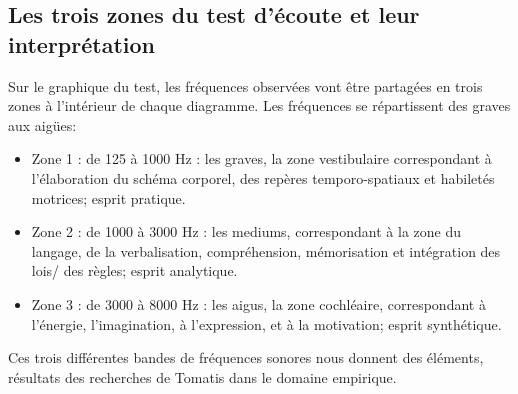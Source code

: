 \subsection*{Les trois zones du test d'écoute et leur interprétation}
Sur le graphique du test, les fréquences observées vont être partagées en
trois zones à l\textquoteright intérieur
de chaque diagramme. Les fréquences se répartissent des
graves aux aigües:
\begin{itemize}
	\item Zone 1 : de 125 à 1000 Hz : les graves, la zone vestibulaire correspondant à l'élaboration
	du schéma corporel, des repères temporo-spatiaux et habiletés motrices; 
	esprit pratique.
	\item Zone 2 : de 1000 à 3000 Hz : les mediums, correspondant à  la zone du langage, de la
	verbalisation, compréhension, %
	mémorisation %
	et intégration des lois/
	des règles; esprit analytique.
	\item Zone 3 : de 3000 à 8000 Hz : les aigus, la zone cochléaire, correspondant à l'énergie,
	 l'imagination, à l'expression, et à la motivation; esprit synthétique.
	
\end{itemize}
Ces trois différentes bandes de fréquences sonores nous donnent des éléments, résultats des   
recherches de Tomatis dans le domaine
empirique. 


